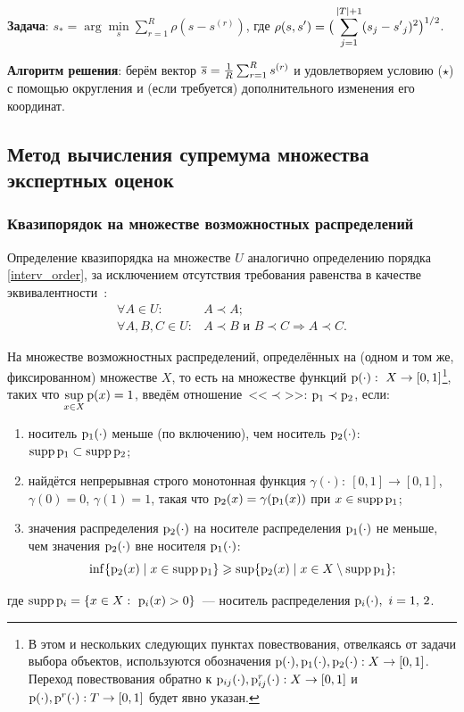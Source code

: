 	\textbf{Задача}: $\displaystyle s_* = \arg \underset{s} \min \sum_{r=1}^R \rho(s - s^{(r)})$, где  $\displaystyle \rho(s, s') = \big( \sum_{j=1}^{\left| T \right|+1}(s_{j} - {s'}_{j})^2 \big)^{1/2}$.
	
	\textbf{Алгоритм решения}:  берём  вектор $ \overline{s} =  \frac{1}{R} \sum_{r=1}^R s^{(r)}$ и удовлетворяем условию ($\star$) с помощью округления и (если требуется) дополнительного изменения его координат.

\subsection{Метод вычисления супремума множества экспертных оценок}
\label{easy_collective_sup}

\subsubsection{Квазипорядок на множестве возможностных распределений}
\label{preorder_pyt}

Определение квазипорядка на множестве $U$ аналогично определению порядка \eqref{interv_order}, за исключением отсутствия требования равенства в качестве эквивалентности~\cite{Mirkin}:  
 \begin{equation}
\label{preoder_def}
\begin{split}
\forall A \in U: & A \prec A; \\
\forall A, B, C \in U: & A \prec B \text{ и } B \prec C \Rightarrow A \prec C.
\end{split}
\end{equation}

На множестве возможностных распределений, определённых на (одном и том же, фиксированном) множестве $X$, то есть на множестве функций $\p(\cdot):\ X\to[0,1]$\footnote{В этом и нескольких следующих пунктах повествования, отвелкаясь от задачи выбора объектов, используются обозначения ${\mathrm{p}}(\cdot), {\mathrm{p}}_1(\cdot), {\mathrm{p}}_2(\cdot): X\to [0,1]$. Переход повествования обратно к ${\mathrm{p}}_{ij}(\cdot),{\mathrm{p}}_{ij}^{r}(\cdot): X\to [0,1] $ и ${\mathrm{p}}(\cdot),{\mathrm{p}}^{r}(\cdot): T\to [0,1] $ будет явно указан.}, таких что $\displaystyle \sup_{x\in X} {\mathrm{p}}(x) = 1$, введём отношение~<<$\prec$>>: ${\mathrm{p}}_1\prec{\mathrm{p}}_2$, если:
\begin{enumerate}
    \item\label{order-D1}
        носитель ${\mathrm{p}}_1(\cdot)$ меньше (по включению), чем носитель ${\mathrm{p}}_2(\cdot)$: ${\mathrm{supp}}\,{\mathrm{p}}_1\subset{\mathrm{supp}}\,{\mathrm{p}}_2$;
    \item\label{order-D2}
        найдётся непрерывная строго монотонная функция ${\gamma(\cdot):\ [0,1]\to[0,1]}$, $\gamma(0) = 0$, $\gamma(1) = 1$, такая что ${\mathrm{p}}_2(x) = \gamma({\mathrm{p}}_1(x))$ при $x\in{\mathrm{supp}}\,{\mathrm{p}}_1$;
    \item\label{order-D3}
        значения распределения ${\mathrm{p}}_2(\cdot)$ на носителе распределения ${\mathrm{p}}_1(\cdot)$ не меньше, чем значения ${\mathrm{p}}_2(\cdot)$ вне носителя ${\mathrm{p}}_1(\cdot)$:
        $$\inf\{{\mathrm{p}}_2(x) \mid x\in{\mathrm{supp}}\,{\mathrm{p}}_1\} \geqslant \sup\{{\mathrm{p}}_2(x) \mid x\in X\setminus{\mathrm{supp}}\,{\mathrm{p}}_1\};$$
\end{enumerate}
где ${\mathrm{supp}}\, {\mathrm{p}}_i = \{x\in X:\ {\mathrm{p}}_i(x) > 0\}$~--- носитель распределения ${\mathrm{p}}_i(\cdot),\ i=1,\, 2$.

